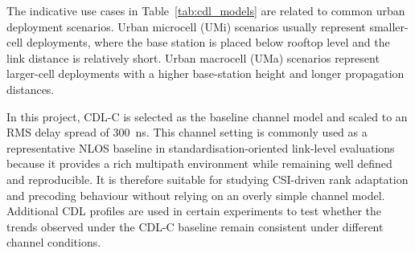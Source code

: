 \documentclass[a4paper,12pt,onecolumn]{article}
\begin{document}
		The indicative use cases in Table~\ref{tab:cdl_models} are related to common urban deployment scenarios. Urban microcell (UMi) scenarios usually represent smaller-cell deployments, where the base station is placed below rooftop level and the link distance is relatively short. Urban macrocell (UMa) scenarios represent larger-cell deployments with a higher base-station height and longer propagation distances. 
		
		In this project, CDL-C is selected as the baseline channel model and scaled to an RMS delay spread of 300~ns. This channel setting is commonly used as a representative NLOS baseline in standardisation-oriented link-level evaluations because it provides a rich multipath environment while remaining well defined and reproducible. It is therefore suitable for studying CSI-driven rank adaptation and precoding behaviour without relying on an overly simple channel model. Additional CDL profiles are used in certain experiments to test whether the trends observed under the CDL-C baseline remain consistent under different channel conditions.
			
\end{document}
